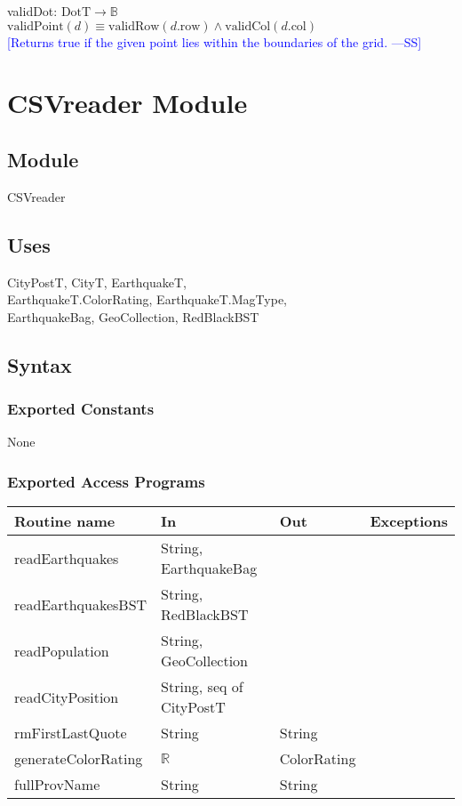 \documentclass[12pt]{article}
\newcommand{\authornote}[3]{\textcolor{#1}{[#3 ---#2]}}
\newcommand{\authornote}[3]{}
\newcommand{\wss}[1]{\authornote{blue}{SS}{#1}}
\begin{document}
\noindent validDot: $\mbox{DotT} \rightarrow \mathbb{B}$\\
$\mbox{validPoint}(d) \equiv \mbox{validRow}(d.\mbox{row}) \wedge \mbox{validCol}(d.\mbox{col})$\\
\noindent \wss{Returns true if the given point lies within the boundaries of the grid.}\\

\newpage

\section* {CSVreader Module}

\subsection* {Module}

CSVreader

\subsection* {Uses}

CityPostT, CityT, EarthquakeT,\\
EarthquakeT.ColorRating, EarthquakeT.MagType,\\
EarthquakeBag, GeoCollection, RedBlackBST

\subsection* {Syntax}

\subsubsection* {Exported Constants}

None

\subsubsection* {Exported Access Programs}

\begin{tabular}{| l | l | l | l |}
\hline
\textbf{Routine name} & \textbf{In} & \textbf{Out} & \textbf{Exceptions}\\
\hline
readEarthquakes & String, EarthquakeBag & ~ & ~\\
\hline
readEarthquakesBST & String, RedBlackBST & ~ & ~\\
\hline
readPopulation & String, GeoCollection & ~ & ~\\
\hline
readCityPosition & String, seq of CityPostT & ~ & ~\\
\hline
rmFirstLastQuote & String & String & ~\\
\hline
generateColorRating & $\mathbb{R}$ & ColorRating & ~\\
\hline
fullProvName & String & String & ~\\
\hline
\end{tabular}
\end{document}
